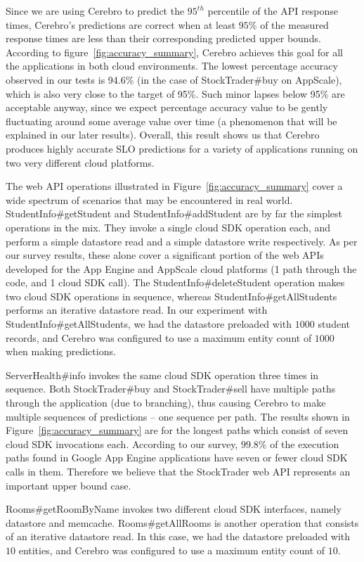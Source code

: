 Since we are using Cerebro to predict the $95^{th}$ percentile of the API
response times, Cerebro's predictions are correct when at 
least $95\%$ of the measured response times are
less than their corresponding predicted upper bounds. According to
figure~\ref{fig:accuracy_summary}, Cerebro achieves this goal for all the
applications in both cloud environments. 
The lowest percentage accuracy observed in our tests is 94.6\% (in the case
of StockTrader\#buy on AppScale), which is also very close to the target of
95\%.  Such minor lapses below 95\% are acceptable anyway, since we expect
percentage accuracy value to be gently fluctuating around some average value
over time (a phenomenon that will be explained in our later results).
Overall, this result shows us that Cerebro produces highly accurate SLO
predictions for a variety of applications running on two very different cloud
platforms.

The web API operations illustrated in Figure~\ref{fig:accuracy_summary} cover
a wide spectrum of scenarios that may be encountered in real world.
StudentInfo\#getStudent and StudentInfo\#addStudent are by far the simplest
operations in the mix. They invoke a single cloud SDK operation each, and
perform a simple datastore read and a simple datastore write respectively. As
per our survey results, these alone cover a significant portion of the web
APIs developed for the App Engine and AppScale cloud platforms (1 path through
the code, and 1 cloud SDK call).  The StudentInfo\#deleteStudent operation
makes two cloud SDK operations in sequence, whereas
StudentInfo\#getAllStudents performs an iterative datastore read.  In our
experiment with StudentInfo\#getAllStudents, we had the datastore preloaded
with $1000$ student records, and Cerebro was configured to use a maximum entity
count of $1000$ when making predictions.

ServerHealth\#info invokes the same cloud SDK operation three times in
sequence. Both StockTrader\#buy and StockTrader\#sell have multiple paths
through the application 
(due to branching), thus causing Cerebro to make multiple
sequences of predictions -- one sequence per path. The results shown in
Figure~\ref{fig:accuracy_summary} are for the longest paths which consist of
seven cloud SDK invocations each. According to our survey, $99.8\%$ of the
execution paths found in Google App Engine applications have seven or 
fewer cloud SDK
calls in them. Therefore we believe that the StockTrader web API
represents an important upper bound case. 

Rooms\#getRoomByName
invokes two different cloud SDK interfaces, namely datastore and memcache.
Rooms\#get\-AllRooms is another operation that consists of an iterative
datastore read. In this case, we had the datastore preloaded with $10$ entities,
and Cerebro was configured to use a maximum entity count of $10$. 

